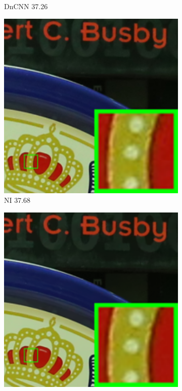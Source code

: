 \begin{figure}
\begin{subfigure}[t]{0.19\textwidth}
\caption{DnCNN 37.26}
    \end{subfigure}
\hfill
    \begin{subfigure}[t]{0.19\textwidth}
        \centering
        \includegraphics[width=1\textwidth]{images/twsc/cc/resize_br_NI_5dmark3_iso3200_1_real.png}
\caption{NI 37.68}
    \end{subfigure}
\hfill
    \begin{subfigure}[t]{0.19\textwidth}
        \centering
        \includegraphics[width=1\textwidth]{images/twsc/cc/resize_br_NC_5dmark3_iso3200_1_real.png}

\end{subfigure}
\end{figure}
